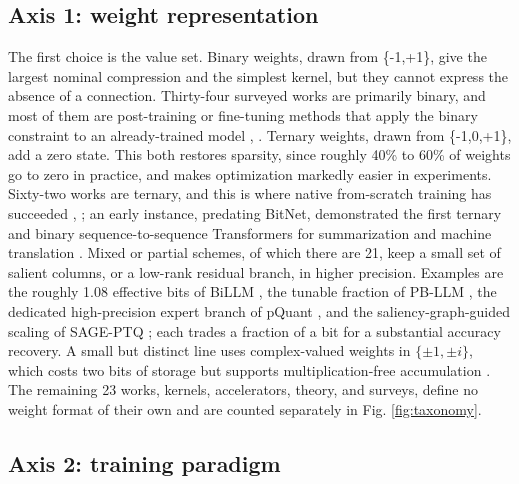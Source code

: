 \documentclass[11pt]{article}
\begin{document}
\subsection{Axis 1: weight representation}

The first choice is the value set. Binary weights, drawn from \{-1,+1\}, give the largest
nominal compression and the simplest kernel, but they cannot express the absence of a
connection. Thirty-four surveyed works are primarily binary, and most of them are
post-training or fine-tuning methods that apply the binary constraint to an
already-trained model \cite{Huang2024-BiLLM,Li2024-ARBLLM,Xu2024-OneBit},
\cite{Ma2024-FBILLM}. Ternary weights, drawn from \{-1,0,+1\}, add a zero state. This both
restores sparsity, since roughly 40\% to 60\% of weights go to zero in practice, and
makes optimization markedly easier in experiments. Sixty-two works are ternary, and
this is where native from-scratch training has succeeded \cite{Ma2024-BitNetB158},
\cite{Kaushal2024-Spectra,Zhu2024-MatmulFree}; an early instance, predating BitNet,
demonstrated the first ternary and binary sequence-to-sequence Transformers for
summarization and machine translation \cite{Liu2023-BinTernNLG}. Mixed or partial schemes, of which there
are 21, keep a small set of salient columns, or a low-rank residual branch, in higher
precision. Examples are the roughly 1.08 effective bits of BiLLM \cite{Huang2024-BiLLM}, the
tunable fraction of PB-LLM \cite{Shang2023-PBLLM}, the dedicated high-precision expert
branch of pQuant \cite{Zhang2026-pQuant}, and the saliency-graph-guided scaling of SAGE-PTQ
\cite{Abdalla2026-SAGEPTQ}; each trades a fraction of a bit for a substantial accuracy
recovery. A small but distinct line uses complex-valued weights in
$\{\pm 1, \pm i\}$, which costs two bits of storage but supports multiplication-free
accumulation \cite{Wang2025-iFairy,Wang2025-Fairy2i}. The remaining 23 works, kernels,
accelerators, theory, and surveys, define no weight format of their own and are counted
separately in Fig. \ref{fig:taxonomy}.

\subsection{Axis 2: training paradigm}
\end{document}
